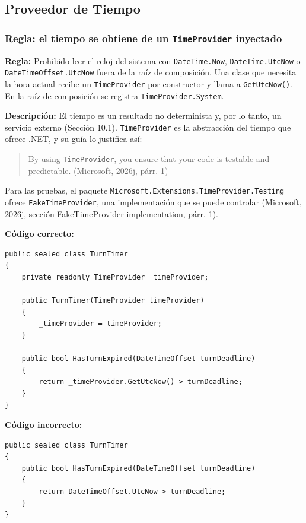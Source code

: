 \subsection{Proveedor de Tiempo}

\subsubsection{Regla: el tiempo se obtiene de un \texttt{TimeProvider} inyectado}

\textbf{Regla:} Prohibido leer el reloj del sistema con \texttt{DateTime.Now}, \texttt{DateTime.UtcNow} o \texttt{DateTimeOffset.UtcNow} fuera de la raíz de composición. Una clase que necesita la hora actual recibe un \texttt{TimeProvider} por constructor y llama a \texttt{GetUtcNow()}. En la raíz de composición se registra \texttt{TimeProvider.System}.

\textbf{Descripción:} El tiempo es un resultado no determinista y, por lo tanto, un servicio externo (Sección 10.1). \texttt{TimeProvider} es la abstracción del tiempo que ofrece .NET, y su guía lo justifica así:
\begin{quote}
By using \texttt{TimeProvider}, you ensure that your code is testable and predictable. (Microsoft, 2026j, párr. 1)
\end{quote}
\noindent Para las pruebas, el paquete \texttt{Microsoft.\allowbreak Extensions.\allowbreak TimeProvider.\allowbreak Testing} ofrece \texttt{FakeTimeProvider}, una implementación que se puede controlar (Microsoft, 2026j, sección FakeTimeProvider implementation, párr. 1).

\textbf{Código correcto:}
\begin{lstlisting}[style=csharpstyle]
public sealed class TurnTimer
{
    private readonly TimeProvider _timeProvider;

    public TurnTimer(TimeProvider timeProvider)
    {
        _timeProvider = timeProvider;
    }

    public bool HasTurnExpired(DateTimeOffset turnDeadline)
    {
        return _timeProvider.GetUtcNow() > turnDeadline;
    }
}
\end{lstlisting}

\textbf{Código incorrecto:}
\begin{lstlisting}[style=csharpstyle]
public sealed class TurnTimer
{
    public bool HasTurnExpired(DateTimeOffset turnDeadline)
    {
        return DateTimeOffset.UtcNow > turnDeadline;
    }
}
\end{lstlisting}
